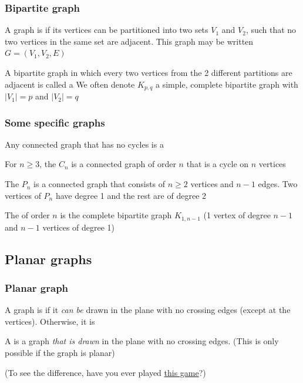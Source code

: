 \documentclass[aspectratio=43]{beamer}
\begin{document}
\begin{frame}\frametitle{Bipartite graph}
	\begin{definition}
		A graph is  if its vertices can be partitioned into two sets $V_1$ and $V_2$, such that no two vertices in the same set are adjacent.
		This graph may be written $G=(V_1,V_2,E)$
	\end{definition}
	\vfill
	\begin{definition}
		A bipartite graph in which every two vertices from the 2 different partitions are adjacent is called a 
		\vskip0.2cm
		We often denote $K_{p,q}$ a simple, complete bipartite graph with $|V_1|=p$ and $|V_2|=q$
	\end{definition}
\end{frame}

\begin{frame}\frametitle{Some specific graphs}
	\begin{definition}[{Tree}]
		Any connected graph that has no cycles is a 
	\end{definition}
	\begin{definition}[{Cycle $C_n$}]
		For $n\geq 3$, the  $C_n$ is a connected graph of order $n$ that is a cycle on $n$ vertices
	\end{definition}
	\begin{definition}[{Path $P_n$}]
		The  $P_n$ is a connected graph that consists of $n\geq 2$ vertices and $n-1$ edges. Two vertices of $P_n$ have degree 1 and the rest are of degree 2
	\end{definition}
	\begin{definition}[{Star $S_n$}]
		The  of order $n$ is the complete bipartite graph $K_{1,n-1}$ (1 vertex of degree $n-1$ and $n-1$ vertices of degree 1)
	\end{definition}
\end{frame}






\subsection{Planar graphs}
\begin{frame}\frametitle{Planar graph}
\begin{definition}
A graph is  if it \emph{can be} drawn in the plane with no crossing edges (except at the vertices). Otherwise, it is 
\end{definition}
\vfill
\begin{definition}
A  is a graph \emph{that is drawn} in the plane with no crossing edges. (This is only possible if the graph is planar)
\end{definition}
\vfill
(To see the difference, have you ever played \href{https://www.chiark.greenend.org.uk/~sgtatham/puzzles/js/untangle.html}{this game}?)
\end{frame}
\end{document}
